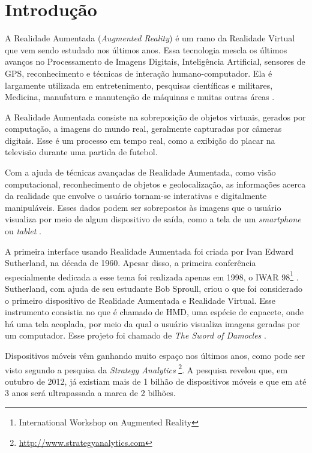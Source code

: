 \chapter{Introdução}


A Realidade Aumentada (\textit{Augmented Reality})
é um ramo da Realidade Virtual 
que vem sendo estudado nos últimos anos. Essa tecnologia
mescla os últimos avanços no Processamento de Imagens Digitais,
Inteligência Artificial, sensores de GPS, reconhecimento e
técnicas de interação humano-computador. Ela é largamente utilizada
em entretenimento, pesquisas científicas e militares, Medicina, manufatura e manutenção
de máquinas e muitas outras áreas \cite{ARFeatureMaching, DevActuallyRegistration}.

A Realidade Aumentada consiste na sobreposição de objetos virtuais, gerados por
computação, a imagens do mundo real, geralmente capturadas por câmeras digitais. Esse é
um processo em tempo real, como a exibição do placar na televisão durante uma partida
de futebol. 

Com a ajuda de técnicas avançadas de Realidade Aumentada, como visão computacional,
reconhecimento de objetos e geolocalização, as informações acerca da realidade que envolve o usuário
tornam-se interativas e digitalmente manipuláveis. Esses dados podem ser sobrepostos
às imagens que o usuário visualiza por meio de algum dispositivo de saída, como a tela de um
\textit{smartphone} ou \textit{tablet} \cite{AReX}.


A primeira interface usando Realidade Aumentada foi criada por Ivan Edward Sutherland, na década de 1960. 
Apesar disso, a primeira conferência especialmente dedicada a esse tema foi realizada apenas 
em 1998, o IWAR 98\footnote{International Workshop on Augmented Reality} \cite{TrendsInAR}. 
Sutherland, com ajuda de seu estudante Bob Sproull, criou o que foi considerado o primeiro dispositivo
de Realidade Aumentada e Realidade Virtual. Esse instrumento consistia no que é chamado de \gls{HMD}, uma
espécie de capacete, onde há uma tela acoplada, por meio da qual o usuário visualiza imagens geradas
por um computador. Esse projeto foi chamado de \textit{The Sword of Damocles} \cite{TheUltimateDisplay}.


Dispositivos móveis vêm ganhando muito espaço nos últimos anos, como pode ser visto segundo a 
pesquisa da \textit{Strategy Analytics}
\footnote{\href{http://www.strategyanalytics.com}{http://www.strategyanalytics.com}}. A pesquisa revelou que,
em outubro de 2012, já existiam mais de 1 bilhão de dispositivos móveis e que em até 3 anos será ultrapassada 
a marca de 2 bilhões. 

